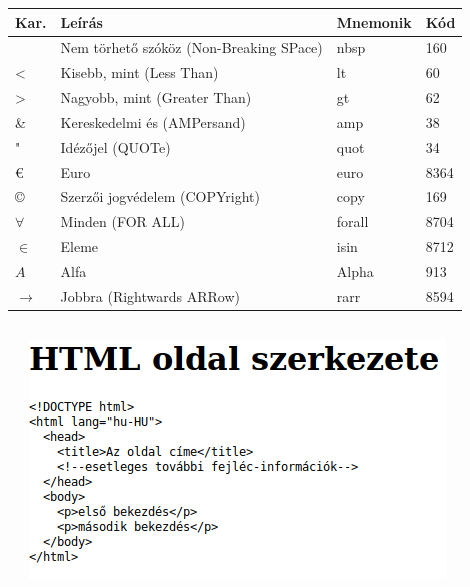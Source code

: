 \begin{frame}
  \begin{table}
    \begin{tabular}{llll}
    Kar.           & Leírás                                  & Mnemonik & Kód  \\ \hline
                   & Nem törhető szóköz (Non-Breaking SPace) & nbsp     & 160  \\
    \textless{}    & Kisebb, mint (Less Than)                & lt       & 60   \\
    \textgreater{} & Nagyobb, mint (Greater Than)            & gt       & 62   \\
    \&             & Kereskedelmi és (AMPersand)             & amp      & 38   \\
    "              & Idézőjel (QUOTe)                        & quot     & 34   \\
    \euro          & Euro                                    & euro     & 8364 \\
    \copyright     & Szerzői jogvédelem (COPYright)          & copy     & 169  \\
    $\forall$      & Minden (FOR ALL)                        & forall   & 8704 \\
    $\in$          & Eleme                                   & isin     & 8712 \\
    $A$            & Alfa                                    & Alpha    & 913  \\
    $\to$          & Jobbra (Rightwards ARRow)               & rarr     & 8594
    \end{tabular}
\end{table}
\end{frame}

\begin{frame}
  \begin{columns}[c]
  \begin{exampleblock}{}
    \scriptsize
    
  \end{exampleblock}
      \includegraphics[width=\textwidth]{entitas.png}
  \end{columns}

\end{frame}

